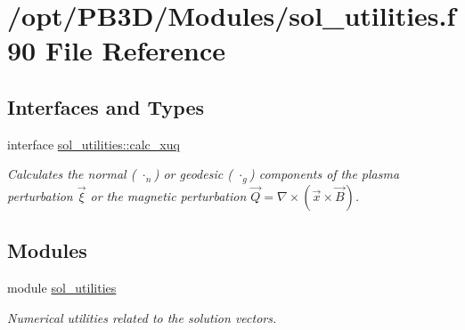 \hypertarget{sol__utilities_8f90}{}\section{/opt/\+P\+B3\+D/\+Modules/sol\+\_\+utilities.f90 File Reference}
\label{sol__utilities_8f90}
\subsection*{Interfaces and Types}
\begin{DoxyCompactItemize}
\item 
interface \hyperlink{interfacesol__utilities_1_1calc__xuq}{sol\+\_\+utilities\+::calc\+\_\+xuq}
\begin{DoxyCompactList}\small\item\em Calculates the normal ( $\cdot_n$) or geodesic ( $\cdot_g$) components of the plasma perturbation $\vec{\xi}$ or the magnetic perturbation $\vec{Q} = \nabla \times \left(\vec{x} \times \vec{B}\right)$. \end{DoxyCompactList}\end{DoxyCompactItemize}
\subsection*{Modules}
\begin{DoxyCompactItemize}
\item 
module \hyperlink{namespacesol__utilities}{sol\+\_\+utilities}
\begin{DoxyCompactList}\small\item\em Numerical utilities related to the solution vectors. \end{DoxyCompactList}\end{DoxyCompactItemize}
